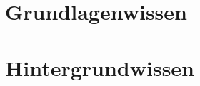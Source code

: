 \documentclass[
    load-dhbw-templates,                  %
    auto-intro-pages = custom,            %
    add-tocs-to-toc,                      %
    mainlanguage = ngerman,               %
    debug                                 %
]{iodhbwm}
\begin{document}
    

    \part{Grundlagenwissen}
    \Blinddocument
    
    \part{Hintergrundwissen}
    \Blinddocument
\end{document}
